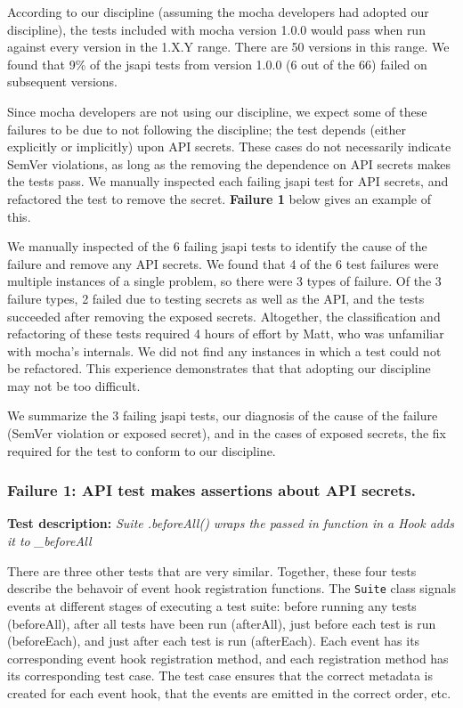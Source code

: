According to our discipline (assuming the mocha developers had adopted
our discipline), the tests included with mocha version 1.0.0 would
pass when run against every version in the 1.X.Y range. There are 50
versions in this range. We found that 9\% of the jsapi tests from
version 1.0.0 (6 out of the 66) failed on subsequent versions.

Since mocha developers are not using our discipline, we expect some of
these failures to be due to not following the discipline; the test
depends (either explicitly or implicitly) upon API secrets. These
cases do not necessarily indicate SemVer violations, as long as the
removing the dependence on API secrets makes the tests pass. We
manually inspected each failing jsapi test for API secrets, and
refactored the test to remove the secret. {\bf Failure 1} below gives
an example of this.

We manually inspected of the 6 failing jsapi tests to identify the
cause of the failure and remove any API secrets. We found that 4 of
the 6 test failures were multiple instances of a single problem, so
there were 3 types of failure. Of the 3 failure types, 2 failed due to
testing secrets as well as the API, and the tests succeeded after
removing the exposed secrets. Altogether, the classification and
refactoring of these tests required 4 hours of effort by Matt, who was
unfamiliar with mocha's internals. We did not find any instances in
which a test could not be refactored. This experience demonstrates
that that adopting our discipline may not be too difficult.

We summarize the 3 failing jsapi tests, our diagnosis of the cause of
the failure (SemVer violation or exposed secret), and in the cases of
exposed secrets, the fix required for the test to conform to our
discipline.

\subsubsection{Failure 1: API test makes assertions about API secrets.}
{\bf Test description: } {\em Suite .beforeAll() wraps the passed in
function in a Hook adds it to \_beforeAll}
\label{sec:failure1}

\/There are three other tests that are very similar. Together, these
four tests describe the behavoir of event hook registration
functions. The {\tt Suite} class signals events at different stages of
executing a test suite: before running any tests (beforeAll), after
all tests have been run (afterAll), just before each test is run
(beforeEach), and just after each test is run (afterEach). Each event
has its corresponding event hook registration method, and each
registration method has its corresponding test case. The test case
ensures that the correct metadata is created for each event hook, that
the events are emitted in the correct order, etc.


